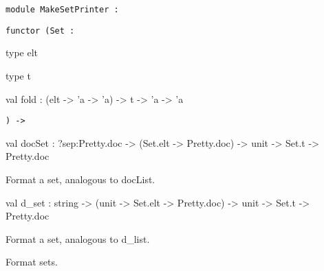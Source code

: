 \documentclass[11pt]{article}
\begin{document}
\begin{ocamldoccode}
{\tt{module }}{\tt{MakeSetPrinter}}{\tt{ : }}\end{ocamldoccode}
\label{module:Pretty.MakeSetPrinter}

{\tt{functor (}}{\tt{Set}}{\tt{ : }}\begin{ocamldocsigend}


\label{type:Pretty.MakeSetPrinter.elt}\begin{ocamldoccode}
type elt 
\end{ocamldoccode}


\label{type:Pretty.MakeSetPrinter.t}\begin{ocamldoccode}
type t 
\end{ocamldoccode}


\label{val:Pretty.MakeSetPrinter.fold}\begin{ocamldoccode}
val fold : (elt -> 'a -> 'a) ->
  t -> 'a -> 'a
\end{ocamldoccode}
\end{ocamldocsigend}
{\tt{) -> }}\begin{ocamldocsigend}


\label{val:Pretty.MakeSetPrinter.docSet}\begin{ocamldoccode}
val docSet :
  ?sep:Pretty.doc -> (Set.elt -> Pretty.doc) -> unit -> Set.t -> Pretty.doc
\end{ocamldoccode}
\begin{ocamldocdescription}
Format a set, analogous to docList.


\end{ocamldocdescription}


\label{val:Pretty.MakeSetPrinter.d-underscoreset}\begin{ocamldoccode}
val d_set :
  string -> (unit -> Set.elt -> Pretty.doc) -> unit -> Set.t -> Pretty.doc
\end{ocamldoccode}
\begin{ocamldocdescription}
Format a set, analogous to d\_list.


\end{ocamldocdescription}
\end{ocamldocsigend}




\begin{ocamldocdescription}
Format sets.


\end{ocamldocdescription}
\end{document}

